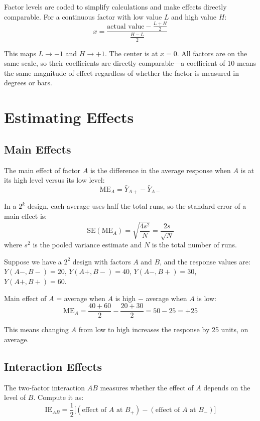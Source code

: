 \documentclass[11pt]{book}
\begin{document}
Factor levels are coded to simplify calculations and make effects directly
comparable. For a continuous factor with low value $L$ and high value $H$:
\[
x = \frac{\text{actual value} - \frac{L+H}{2}}{\frac{H-L}{2}}
\]

This maps $L \to -1$ and $H \to +1$. The center is at $x=0$. All factors are on
the same scale, so their coefficients are directly comparable---a coefficient of
10 means the same magnitude of effect regardless of whether the factor is
measured in degrees or bars.

\section{Estimating Effects}

\subsection{Main Effects}

The main effect of factor $A$ is the difference in the average response when $A$
is at its high level versus its low level:
\[
\text{ME}_A = \bar{Y}_{A+} - \bar{Y}_{A-}
\]

In a $2^k$ design, each average uses half the total runs, so the standard error
of a main effect is:
\[
\text{SE}(\text{ME}_A) = \sqrt{\frac{4s^2}{N}}
= \frac{2s}{\sqrt{N}}
\]
where $s^2$ is the pooled variance estimate and $N$ is the total number of runs.

\begin{example}
Suppose we have a $2^2$ design with factors $A$ and $B$, and the response values are:
$Y(A{-}, B{-}) = 20$, $Y(A{+}, B{-}) = 40$, $Y(A{-}, B{+}) = 30$, $Y(A{+}, B{+}) = 60$.

Main effect of $A$ = average when $A$ is high $-$ average when $A$ is low:
\[
\text{ME}_A = \frac{40 + 60}{2} - \frac{20 + 30}{2} = 50 - 25 = +25
\]

This means changing $A$ from low to high increases the response by 25 units, on average.
\end{example}

\subsection{Interaction Effects}

The two-factor interaction $AB$ measures whether the effect of $A$ depends on the
level of $B$. Compute it as:
\[
\text{IE}_{AB} = \frac{1}{2}\bigl[(\text{effect of } A \text{ at } B_{+})
- (\text{effect of } A \text{ at } B_{-})\bigr]
\]
\end{document}
